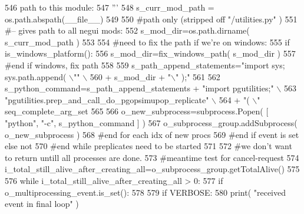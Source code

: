 \begin{DoxyCode}
546 \textcolor{stringliteral}{                    path to this module:}
547 \textcolor{stringliteral}{                    '''}
548                     s\_curr\_mod\_path = os.path.abspath(\_\_file\_\_)
549 
550                     \textcolor{comment}{#path only (stripped off "/utilities.py" )}
551                     \textcolor{comment}{#-- gives path to all negui mods:}
552                     s\_mod\_dir=os.path.dirname( s\_curr\_mod\_path )
553 
554                     \textcolor{comment}{#need to fix the path if we're on windows:}
555                     \textcolor{keywordflow}{if} is\_windows\_platform():
556                         s\_mod\_dir=fix\_windows\_path( s\_mod\_dir )
557                     \textcolor{comment}{#end if windows, fix path}
558                     
559                     s\_path\_append\_statements=\textcolor{stringliteral}{"import sys; sys.path.append( \(\backslash\)""} \(\backslash\)
560                             + s\_mod\_dir + \textcolor{stringliteral}{"\(\backslash\)" );"}
561 
562                     s\_python\_command=s\_path\_append\_statements + \textcolor{stringliteral}{"import pgutilities;"} \(\backslash\)
563                                         \textcolor{stringliteral}{"pgutilities.prep\_and\_call\_do\_pgopsimupop\_replicate"} \(\backslash\)
564                                         + \textcolor{stringliteral}{"( \(\backslash\)"%
      seq\_complete\_arg\_set
565 
566                     o\_new\_subprocess=subprocess.Popen( [ \textcolor{stringliteral}{"python"}, \textcolor{stringliteral}{"-c"}, s\_python\_command ] )
567                     o\_subprocess\_group.addSubprocess( o\_new\_subprocess ) 
568                 \textcolor{comment}{#end for each idx of new procs}
569             \textcolor{comment}{#end if event is set else not}
570         \textcolor{comment}{#end while preplicates need to be started}
571 
572         \textcolor{comment}{#we don't want to return untill all processes are done.}
573         \textcolor{comment}{#meantime test for cancel-request}
574         i\_total\_still\_alive\_after\_creating\_all=o\_subprocess\_group.getTotalAlive()
575 
576         \textcolor{keywordflow}{while} i\_total\_still\_alive\_after\_creating\_all > 0:
577             \textcolor{keywordflow}{if} o\_multiprocessing\_event.is\_set():
578 
579                 \textcolor{keywordflow}{if} VERBOSE:
580                     print( \textcolor{stringliteral}{"received event in final loop"} )
}
\end{DoxyCode}
